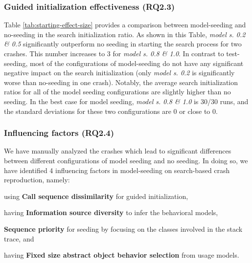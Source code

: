 \subsubsection{Guided initialization effectiveness (\textbf{RQ2.3})}

Table \ref{tab:starting-effect-size}  provides a comparison between model-seeding and no-seeding in the search initialization ratio. As shown in this Table, \textit{model s. 0.2 \& 0.5} significantly outperform no seeding in starting the search process for two crashes. This number increases to 3 for \textit{model s. 0.8 \& 1.0}. In contrast to test-seeding, most of the configurations of model-seeding do not have any significant negative impact on the search initialization (only \textit{model s. 0.2} is significantly worse than no-seeding in one crash). Notably, the average search initialization ratios for all of the model seeding configurations are slightly higher than no seeding. In the best case for model seeding, \textit{model s. 0.8 \& 1.0} is 30/30 runs, and the standard deviations for these two configurations are 0 or close to 0.

% 	

\subsubsection{Influencing factors (\textbf{RQ2.4})}

We have manually analyzed the crashes which lead to significant differences between different configurations of model seeding and no seeding. In doing so, we have identified 4 influencing factors in model-seeding on search-based crash reproduction, namely:
%
\begin{inparaenum}[(i)]
\item using \textbf{Call sequence dissimilarity} for guided initialization,
\item having \textbf{Information source diversity} to infer the behavioral models,
\item \textbf{Sequence priority} for seeding by focusing on the classes involved in the stack trace, and
\item having \textbf{Fixed size abstract object behavior selection} from usage models.
\end{inparaenum}

